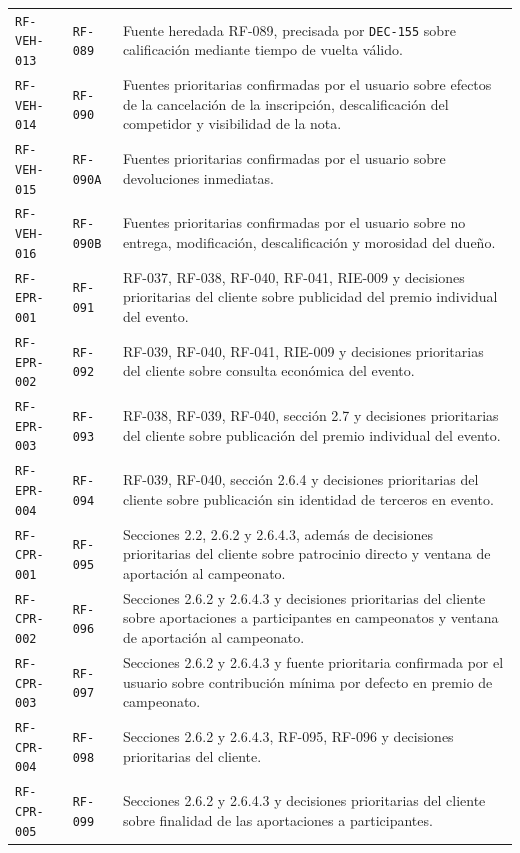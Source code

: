 \documentclass[10pt,letterpaper]{article}
\begin{document}
\begin{landscape}
\begin{longtable}{P{2.7cm}P{2.6cm}P{15.7cm}}
\texttt{RF-VEH-013} & \texttt{RF-089} & Fuente heredada RF-089, precisada por \texttt{DEC-155} sobre calificación mediante tiempo de vuelta válido.\\
\texttt{RF-VEH-014} & \texttt{RF-090} & Fuentes prioritarias confirmadas por el usuario sobre efectos de la cancelación de la inscripción, descalificación del competidor y visibilidad de la nota.\\
\texttt{RF-VEH-015} & \texttt{RF-090A} & Fuentes prioritarias confirmadas por el usuario sobre devoluciones inmediatas.\\
\texttt{RF-VEH-016} & \texttt{RF-090B} & Fuentes prioritarias confirmadas por el usuario sobre no entrega, modificación, descalificación y morosidad del dueño.\\
\texttt{RF-EPR-001} & \texttt{RF-091} & RF-037, RF-038, RF-040, RF-041, RIE-009 y decisiones prioritarias del cliente sobre publicidad del premio individual del evento.\\
\texttt{RF-EPR-002} & \texttt{RF-092} & RF-039, RF-040, RF-041, RIE-009 y decisiones prioritarias del cliente sobre consulta económica del evento.\\
\texttt{RF-EPR-003} & \texttt{RF-093} & RF-038, RF-039, RF-040, sección 2.7 y decisiones prioritarias del cliente sobre publicación del premio individual del evento.\\
\texttt{RF-EPR-004} & \texttt{RF-094} & RF-039, RF-040, sección 2.6.4 y decisiones prioritarias del cliente sobre publicación sin identidad de terceros en evento.\\
\texttt{RF-CPR-001} & \texttt{RF-095} & Secciones 2.2, 2.6.2 y 2.6.4.3, además de decisiones prioritarias del cliente sobre patrocinio directo y ventana de aportación al campeonato.\\
\texttt{RF-CPR-002} & \texttt{RF-096} & Secciones 2.6.2 y 2.6.4.3 y decisiones prioritarias del cliente sobre aportaciones a participantes en campeonatos y ventana de aportación al campeonato.\\
\texttt{RF-CPR-003} & \texttt{RF-097} & Secciones 2.6.2 y 2.6.4.3 y fuente prioritaria confirmada por el usuario sobre contribución mínima por defecto en premio de campeonato.\\
\texttt{RF-CPR-004} & \texttt{RF-098} & Secciones 2.6.2 y 2.6.4.3, RF-095, RF-096 y decisiones prioritarias del cliente.\\
\texttt{RF-CPR-005} & \texttt{RF-099} & Secciones 2.6.2 y 2.6.4.3 y decisiones prioritarias del cliente sobre finalidad de las aportaciones a participantes.\\

\end{longtable}
\end{landscape}
\end{document}
